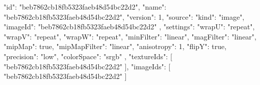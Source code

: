 {
  "id": "beb7862cb18fb5323faeb48d54bc22d2",
  "name": "beb7862cb18fb5323faeb48d54bc22d2",
  "version": 1,
  "source": {
    "kind": "image",
    "imageId": "beb7862cb18fb5323faeb48d54bc22d2"
  },
  "settings": {
    "wrapU": "repeat",
    "wrapV": "repeat",
    "wrapW": "repeat",
    "minFilter": "linear",
    "magFilter": "linear",
    "mipMap": true,
    "mipMapFilter": "linear",
    "anisotropy": 1,
    "flipY": true,
    "precision": "low",
    "colorSpace": "srgb"
  },
  "textureIds": [
    "beb7862cb18fb5323faeb48d54bc22d2"
  ],
  "imageIds": [
    "beb7862cb18fb5323faeb48d54bc22d2"
  ]
}

